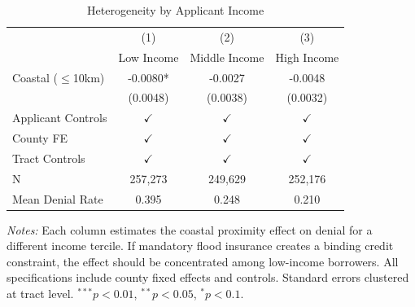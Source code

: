\begin{table}[htbp]
\centering
\caption{Heterogeneity by Applicant Income}
\label{tab:income}
\small
\begin{tabular}{lccc}
\hline\hline
 & (1) & (2) & (3) \\
 & Low Income & Middle Income & High Income \\
\hline
Coastal ($\leq$10km) & -0.0080* & -0.0027 & -0.0048 \\
 & (0.0048) & (0.0038) & (0.0032) \\
\hline
Applicant Controls & $\checkmark$ & $\checkmark$ & $\checkmark$ \\
County FE & $\checkmark$ & $\checkmark$ & $\checkmark$ \\
Tract Controls & $\checkmark$ & $\checkmark$ & $\checkmark$ \\
\hline
N & 257,273 & 249,629 & 252,176 \\
Mean Denial Rate & 0.395 & 0.248 & 0.210 \\
\hline\hline
\end{tabular}
\begin{tablenotes}[flushleft]\small
\item \textit{Notes:} Each column estimates the coastal proximity effect on denial for a different income tercile. If mandatory flood insurance creates a binding credit constraint, the effect should be concentrated among low-income borrowers. All specifications include county fixed effects and controls. Standard errors clustered at tract level. $^{***}p<0.01$, $^{**}p<0.05$, $^{*}p<0.1$.
\end{tablenotes}
\end{table}

